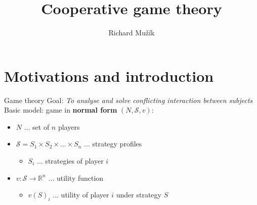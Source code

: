 \documentclass{beamer}
\title{Cooperative game theory}
\author{Richard Mužík}
\institute{richard@imuzik.cz}
\begin{document}

\begin{frame}
	\maketitle %
\end{frame}


\begin{comment}
    - Představit kooperativní hru
    - Cíl: Rozdělení zisku v(N)
    - payoff vektor, imputace
    - jádro (důraz na koaliční racionalitu, tj. vysvětlit, proč je jádro stabilní solution concept)
    - Shapleyho hodnota (pomocí formule i axiomů)
    - třídy her (monotonní, superadditivní, konvexní) a jejich vztahy
\end{comment}


\section{Motivations and introduction} %


\begin{frame}{Game theory}
Goal: \textit{To analyse and solve conflicting interaction between subjects}\vspace{0.5in}\\
\pause
Basic model: game in \textbf{normal form} $(N,\mathcal{S},v)$:
\pause
    \begin{itemize}
        \item $N$ ... set of $n$ players
        \pause
        \item $\mathcal{S} = S_1 \times S_2 \times \dots \times S_n$ ... strategy profiles
        \pause
        \begin{itemize}
            \item $S_i$ ... strategies of player $i$
        \end{itemize}
        \pause
        \item $v\colon \mathcal{S} \to \mathbb{R}^n$ ... utility function
        \begin{itemize}
        \pause
            \item $v(S)_i$ ... utility of player $i$ under strategy $S$
        \end{itemize} 
    \end{itemize}
\end{frame}
\end{document}
